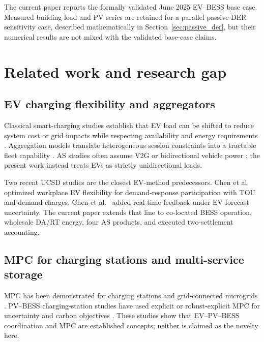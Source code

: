 \documentclass[final,5p,times]{elsarticle}
\begin{document}
The current paper reports the formally validated June 2025 EV--BESS base case. Measured building-load and PV series are retained for a parallel passive-DER sensitivity case, described mathematically in Section~\ref{sec:passive_der}, but their numerical results are not mixed with the validated base-case claims.

\section{Related work and research gap}
\label{sec:literature}

\subsection{EV charging flexibility and aggregators}
Classical smart-charging studies establish that EV load can be shifted to reduce system cost or grid impacts while respecting availability and energy requirements \cite{clement2010impact,sortomme2011optimal,gan2013optimal,richardson2013electric}. Aggregation models translate heterogeneous session constraints into a tractable fleet capability \cite{nazari2022updated,alTaha2025aggregateFlex}. AS studies often assume V2G or bidirectional vehicle power \cite{sortomme2012v2gAncillary,clairand2020ancillary}; the present work instead treats EVs as strictly unidirectional loads.

Two recent UCSD studies are the closest EV-method predecessors. Chen et al.~\cite{chen2024costoptimal} optimized workplace EV flexibility for demand-response participation with TOU and demand charges. Chen et al.~\cite{chen2026realtime} added real-time feedback under EV forecast uncertainty. The current paper extends that line to co-located BESS operation, wholesale DA/RT energy, four AS products, and executed two-settlement accounting.

\subsection{MPC for charging stations and multi-service storage}
MPC has been demonstrated for charging stations and grid-connected microgrids \cite{hermans2024implementation,klemets2024charging}. PV--BESS charging-station studies have used explicit or robust-explicit MPC for uncertainty and carbon objectives \cite{cabrera2022realtime,cabrera2024robust}. These studies show that EV--PV--BESS coordination and MPC are established concepts; neither is claimed as the novelty here.
\end{document}
